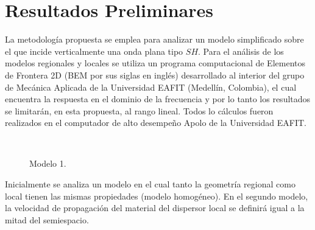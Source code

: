 \documentclass[spanish,letterpaper,12pt,twoside,openany]{article}
\begin{document}
\section{Resultados Preliminares}
%
La metodología propuesta se emplea para analizar un modelo simplificado sobre el que incide verticalmente una onda plana tipo $SH$. Para el análisis de los modelos regionales y locales se utiliza un programa computacional de Elementos de Frontera 2D (BEM por sus siglas en inglés) desarrollado al interior del grupo de Mecánica Aplicada de la Universidad EAFIT (Medellín, Colombia), el cual encuentra la respuesta en el dominio de la frecuencia y por lo tanto los resultados se limitarán, en esta propuesta, al rango lineal. Todos lo cálculos fueron realizados en el computador de alto desempeño Apolo de la Universidad EAFIT.
%
\begin{figure}[H]
	\centering
	\\
	\vspace{-.5 cm}
    \caption{Modelo 1.}
    \label{fig:model1}
    \vspace{-.5 cm}
\end{figure}
%
Inicialmente se analiza un modelo en el cual tanto la geometría regional como local tienen las mismas propiedades (modelo homogéneo). En el segundo modelo, la velocidad de propagación del material del dispersor local se definirá igual a la mitad del semiespacio.
\end{document}
